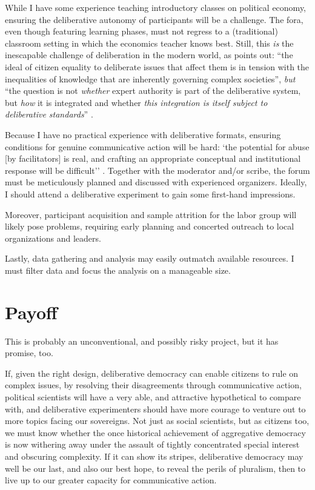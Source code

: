 While I have some experience teaching introductory classes on political economy, ensuring the deliberative autonomy of participants will be a challenge.
The fora, even though featuring learning phases, must not regress to a (traditional) classroom setting in which the economics teacher knows best.
Still, this \emph{is} the inescapable challenge of deliberation in the modern world, as \citeauthor{Moore2011} points out: 
``the ideal of citizen equality to deliberate issues that affect them is in tension with the inequalities of knowledge that are inherently governing complex societies'', \emph{but} ``the question is not \emph{whether} expert authority is part of the deliberative system, but \emph{how} it is integrated and whether \emph{this integration is itself subject to deliberative standards}'' \cite[14, emphasis added]{Moore2011}.

Because I have no practical experience with deliberative formats, ensuring conditions for genuine communicative action will be hard: `the potential for abuse [by facilitators] is real, and crafting an appropriate conceptual and institutional response will be difficult'' \citep[25]{GutmannThompson-2004-aa}.
Together with the moderator and/or scribe, the forum must be meticulously planned and discussed with experienced organizers.
Ideally, I should attend a deliberative experiment to gain some first-hand impressions.

Moreover, participant acquisition and sample attrition for the labor group will likely pose problems, requiring early planning and concerted outreach to local organizations and leaders.

Lastly, data gathering and analysis may easily outmatch available resources.
I must filter data and focus the analysis on a manageable size.

\section{Payoff}
This is probably an unconventional, and possibly risky project, but it has promise, too.

If, given the right design, deliberative democracy can enable citizens to rule on complex issues, by resolving their disagreements through communicative action, political scientists will have a very able, and attractive hypothetical to compare with, and deliberative experimenters should have more courage to venture out to more topics facing our sovereigns.
Not just as social scientists, but as citizens too, we must know whether the once historical achievement of aggregative democracy is now withering away under the assault of tightly concentrated special interest and obscuring complexity.
If it can show its stripes, deliberative democracy may well be our last, and also our best hope, to reveal the perils of pluralism, then to live up to our greater capacity for communicative action.

